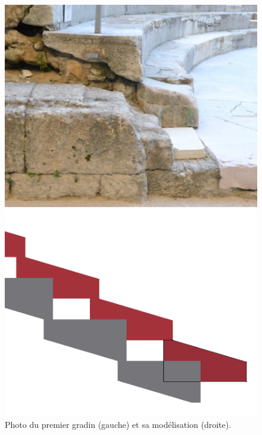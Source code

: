 \begin{figure}[!h] 
	\begin{subfigureth}{0.49\textwidth}
		\includegraphics[scale=0.37]{images/gradinCoupe}
		\caption[Repose pied et premier gradin du premier \gls{cuneus}]{Le repose pied et le premier gradin du premier \gls{cuneus} : vu de l'extrémité nord avec au premier plan, le mur bordant l'\gls{aditus} est.} 
		\label{coupeGradin} 		
	\end{subfigureth}	
	\qquad
	\begin{subfigureth}{0.49\textwidth}
		\includegraphics[scale=0.22]{images/escaliers}
		\caption[Modélisation des \glspl{maenianum}]{Modélisation des \glspl{maenianum} et de l'empreinte des escaliers à retirer après application des modificateurs Tableau et Visser.}
		\label{modelMaenianum} 		
	\end{subfigureth}	
	\caption{Photo du premier gradin (gauche) et sa modélisation (droite).}
\end{figure}

